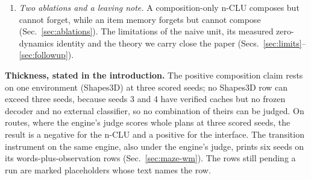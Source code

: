 \documentclass{article} %
\begin{document}
\begin{enumerate}[leftmargin=*,itemsep=2pt]
  the best matched baseline on three seeds, level with it at the ceiling on two and behind on one (mean
  +0.046). A colour-relational request coding lifts the n-CLU on every seed, but baselines handed the %
  same columns close most of that gap, so it is an input-representation result, not an n-CLU result
  (Sec.~\ref{sec:maze-wm}). We offer the transition instrument itself as a minor contribution.
\item \emph{Two ablations and a leaving note.} A composition-only n-CLU composes but cannot
  forget, while an item memory forgets but cannot compose (Sec.~\ref{sec:ablations}). The
  limitations of the naive unit, its measured zero-dynamics identity and the theory we carry
  close the paper (Secs.~\ref{sec:limits}--\ref{sec:followup}).
\end{enumerate}

\noindent\textbf{Thickness, stated in the introduction.} The positive composition claim rests
on one environment (Shapes3D) at three scored seeds; no Shapes3D row can exceed three seeds,
because seeds 3 and 4 have verified caches but no frozen decoder and no external classifier, so no
combination of theirs can be judged. %
On routes, where the engine's judge scores whole plans at three scored seeds, the result is
a negative for the n-CLU and a positive for the interface. The transition instrument on the same
engine, also under the engine's judge, prints six seeds on its words-plus-observation rows
(Sec.~\ref{sec:maze-wm}). The rows still pending a run are marked placeholders whose text names the row.

\end{document}
